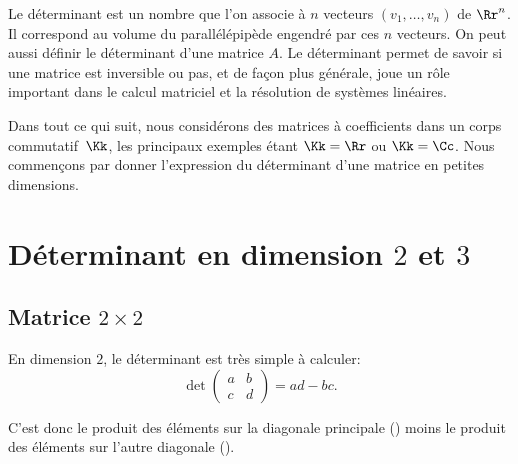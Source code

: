 \documentclass[class=report,crop=false]{standalone}
\begin{document}







\bigskip


Le déterminant est un nombre que l'on associe à $n$ vecteurs $(v_1,\ldots,v_n)$ de $\Rr^n$.
Il correspond au volume du parallélépipède engendré par ces $n$ vecteurs.
On peut aussi définir le déterminant d'une matrice $A$. Le déterminant permet de savoir
si une matrice est inversible ou pas, et de façon plus générale,
joue un rôle important dans le calcul matriciel et la résolution de systèmes linéaires.

\medskip

Dans tout ce qui suit, nous considérons des matrices à coefficients
dans un corps commutatif~$\Kk$, les principaux exemples étant $\Kk=\Rr$ ou $\Kk=\Cc$.
Nous commençons par donner l'expression du déterminant d'une matrice en petites dimensions.


\section{Déterminant en dimension $2$ et $3$}

\subsection{Matrice $2 \times 2$}

En dimension $2$, le déterminant est très simple à calculer:
$$\det \begin{pmatrix}a&b\\c&d\end{pmatrix} = ad-bc.$$


C'est donc le produit des éléments sur la diagonale principale
() moins le produit des éléments sur l'autre diagonale 
().
\end{document}

